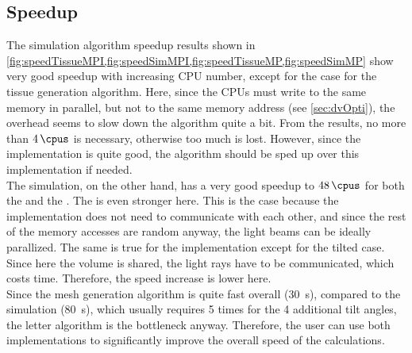 \subsection{Speedup} 
% 
The simulation algorithm speedup results shown in \cref{fig:speedTissueMPI,fig:speedSimMPI,fig:speedTissueMP,fig:speedSimMP} show very good speedup with increasing \ac{CPU} number, except for the \openmp{} case for the tissue generation algorithm.
Here, since the \acsp{CPU} must write to the same memory in parallel, but not to the same memory address (see \cref{sec:dvOpti}), the overhead seems to slow down the algorithm quite a bit.
From the results, no more than $\SI{4}{\cpus}$ is necessary, otherwise too much \dummy{} is lost.
However, since the \mpi{} implementation is quite good, the algorithm should be sped up over this implementation if needed.
\\
% 
The simulation, on the other hand, has a very good speedup to $\SI{48}{\cpus}$ for both the \mpi{} and the \openmp{}.
The \openmp{} is even stronger here.
This is the case because the \openmp{} implementation does not need to communicate with each other, and since the rest of the memory accesses are random anyway, the light beams can be ideally parallized.
The same is true for the \mpi{} implementation except for the tilted case.
Since here the volume is shared, the light rays have to be communicated, which costs time.
Therefore, the speed increase is lower here.
\\
% 
Since the mesh generation algorithm is quite fast overall (\SI{30}{\second}), compared to the simulation (\SI{80}{\second}), which usually requires 5 times for the 4 additional tilt angles, the letter algorithm is the bottleneck anyway.
Therefore, the user can use both implementations to significantly improve the overall speed of the calculations.
% 
% 
% 
